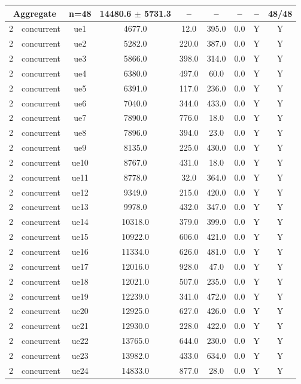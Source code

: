 \begin{table}[ht]
\begin{tabular}{|c|c|c|c|c|c|c|c|c|}
\multicolumn{2}{|c|}{\textbf{Aggregate}} & n=48 & 14480.6 $\pm$ 5731.3 & -- & -- & -- & -- & 48/48 \\
\hline
2 & concurrent & ue1 & 4677.0 & 12.0 & 395.0 & 0.0 & Y & Y \\
2 & concurrent & ue2 & 5282.0 & 220.0 & 387.0 & 0.0 & Y & Y \\
2 & concurrent & ue3 & 5866.0 & 398.0 & 314.0 & 0.0 & Y & Y \\
2 & concurrent & ue4 & 6380.0 & 497.0 & 60.0 & 0.0 & Y & Y \\
2 & concurrent & ue5 & 6391.0 & 117.0 & 236.0 & 0.0 & Y & Y \\
2 & concurrent & ue6 & 7040.0 & 344.0 & 433.0 & 0.0 & Y & Y \\
2 & concurrent & ue7 & 7890.0 & 776.0 & 18.0 & 0.0 & Y & Y \\
2 & concurrent & ue8 & 7896.0 & 394.0 & 23.0 & 0.0 & Y & Y \\
2 & concurrent & ue9 & 8135.0 & 225.0 & 430.0 & 0.0 & Y & Y \\
2 & concurrent & ue10 & 8767.0 & 431.0 & 18.0 & 0.0 & Y & Y \\
2 & concurrent & ue11 & 8778.0 & 32.0 & 364.0 & 0.0 & Y & Y \\
2 & concurrent & ue12 & 9349.0 & 215.0 & 420.0 & 0.0 & Y & Y \\
2 & concurrent & ue13 & 9978.0 & 432.0 & 347.0 & 0.0 & Y & Y \\
2 & concurrent & ue14 & 10318.0 & 379.0 & 399.0 & 0.0 & Y & Y \\
2 & concurrent & ue15 & 10922.0 & 606.0 & 421.0 & 0.0 & Y & Y \\
2 & concurrent & ue16 & 11334.0 & 626.0 & 481.0 & 0.0 & Y & Y \\
2 & concurrent & ue17 & 12016.0 & 928.0 & 47.0 & 0.0 & Y & Y \\
2 & concurrent & ue18 & 12021.0 & 507.0 & 235.0 & 0.0 & Y & Y \\
2 & concurrent & ue19 & 12239.0 & 341.0 & 472.0 & 0.0 & Y & Y \\
2 & concurrent & ue20 & 12925.0 & 627.0 & 426.0 & 0.0 & Y & Y \\
2 & concurrent & ue21 & 12930.0 & 228.0 & 422.0 & 0.0 & Y & Y \\
2 & concurrent & ue22 & 13765.0 & 644.0 & 230.0 & 0.0 & Y & Y \\
2 & concurrent & ue23 & 13982.0 & 433.0 & 634.0 & 0.0 & Y & Y \\
2 & concurrent & ue24 & 14833.0 & 877.0 & 28.0 & 0.0 & Y & Y \\

\end{tabular}
\end{table}
